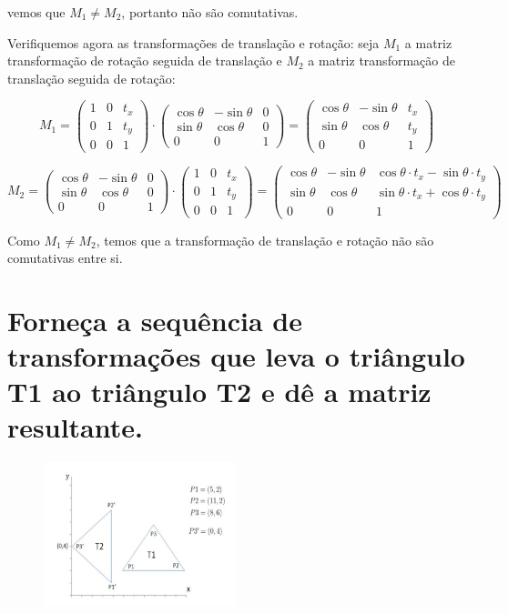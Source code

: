 \documentclass{article}
\begin{document}
\noindent vemos que $M_1 \neq M_2$, portanto não são comutativas.

Verifiquemos agora as transformações de translação e rotação: seja $M_1$ a matriz transformação de rotação seguida de translação e $M_2$ a matriz transformação de translação seguida de rotação:

$$M_1 = \begin{pmatrix}
		1 & 0 & t_x\\
		0 & 1 & t_y\\
		0 & 0 & 1
\end{pmatrix}
\cdot
	\begin{pmatrix}
		\cos\theta & -\sin\theta & 0\\
		\sin\theta & \cos\theta & 0\\
		0 & 0 & 1
	\end{pmatrix}
=
\begin{pmatrix}
	\cos\theta & -\sin\theta & t_x\\
	\sin\theta & \cos\theta & t_y\\
	0 & 0 & 1
\end{pmatrix}
$$

$$M_2 = \begin{pmatrix}
	\cos\theta & -\sin\theta & 0\\
	\sin\theta & \cos\theta & 0\\
	0 & 0 & 1
\end{pmatrix}
\cdot
\begin{pmatrix}
	1 & 0 & t_x\\
	0 & 1 & t_y\\
	0 & 0 & 1
\end{pmatrix}
=
\begin{pmatrix}
	\cos\theta & -\sin\theta & \cos\theta \cdot t_x -\sin\theta \cdot t_y\\
	\sin\theta & \cos\theta & \sin\theta \cdot t_x +\cos\theta \cdot t_y\\
	0 & 0 & 1
\end{pmatrix}
$$

Como $M_1 \neq M_2$, temos que a transformação de translação e rotação não são comutativas entre si.


\section{Forneça a sequência de transformações que leva o triângulo T1 ao triângulo T2 e dê a matriz resultante.}

\begin{figure}[ht!]
	\centering
	\includegraphics[width=0.5\textwidth]{img/img3.png}
\end{figure}
\end{document}
